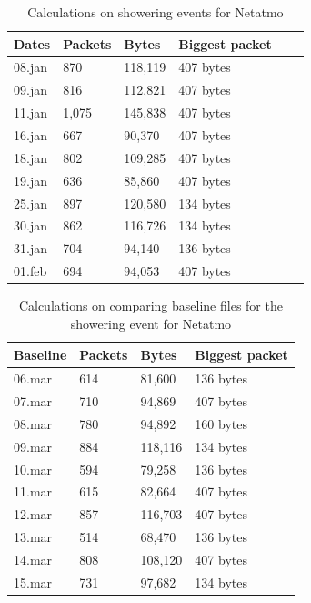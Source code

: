 \begin{table}[H]
    \centering
    \caption{Calculations on showering events for Netatmo}
    \begin{tabular}{|l|l|l|l|l|l|}
    \hline
        \textbf{Dates} & \textbf{Packets} & \textbf{Bytes} & \textbf{Biggest packet} \\ \hline
        08.jan & 870   & 118,119 & 407 bytes\\ \hline
        09.jan & 816   & 112,821 & 407 bytes \\ \hline
        11.jan & 1,075 & 145,838 & 407 bytes\\ \hline
        16.jan & 667   & 90,370  & 407 bytes\\ \hline
        18.jan & 802   & 109,285 & 407 bytes\\ \hline
        19.jan & 636   & 85,860  & 407 bytes \\ \hline
        25.jan & 897   & 120,580 & 134 bytes \\ \hline
        30.jan & 862   & 116,726 & 134 bytes \\ \hline
        31.jan & 704   & 94,140  & 136 bytes \\ \hline
        01.feb & 694   & 94,053  & 407 bytes \\ \hline
    \end{tabular}
    \label{tab:NetatmoShowerCalculations}
\end{table}

\begin{table}[H]
    \centering
    \caption{Calculations on comparing baseline files for the showering event for Netatmo}
    \begin{tabular}{|l|l|l|l|}
    \hline
        \textbf{Baseline} & \textbf{Packets} & \textbf{Bytes} & \textbf{Biggest packet} \\ \hline
        06.mar & 614 & 81,600  & 136 bytes\\ \hline
        07.mar & 710 & 94,869  & 407 bytes\\ \hline
        08.mar & 780 & 94,892  & 160 bytes \\ \hline
        09.mar & 884 & 118,116 & 134 bytes \\ \hline
        10.mar & 594 & 79,258  & 136 bytes \\ \hline
        11.mar & 615 & 82,664  & 407 bytes \\ \hline
        12.mar & 857 & 116,703 & 407 bytes \\ \hline
        13.mar & 514 & 68,470  & 136 bytes \\ \hline
        14.mar & 808 & 108,120 & 407 bytes \\ \hline
        15.mar & 731 & 97,682  & 134 bytes \\ \hline
    \end{tabular}
    \label{tab:NetatmoBaselineShowerCalculations}
\end{table}

